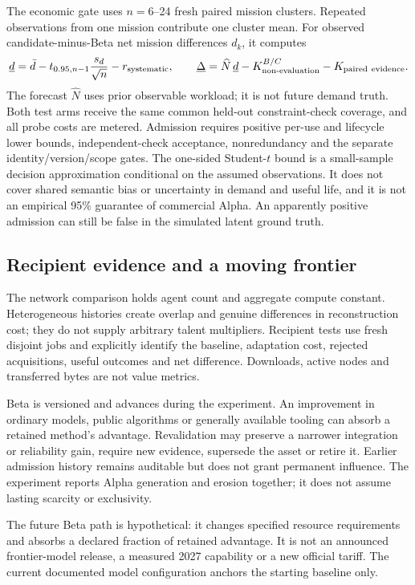 \documentclass[11pt,a4paper]{article}
\begin{document}
The economic gate uses $n=6$--24 fresh paired mission clusters. Repeated observations from one mission contribute one cluster mean. For observed candidate-minus-Beta net mission differences $d_k$, it computes
\begin{equation}
 \underline d=\bar d-t_{0.95,n-1}\frac{s_d}{\sqrt n}-r_{\rm systematic},\qquad
 \underline\Delta=\widehat N\,\underline d-K^{B/C}_{\rm non\text{-}evaluation}-K_{\rm paired\ evidence}.
\end{equation}
The forecast $\widehat N$ uses prior observable workload; it is not future demand truth. Both test arms receive the same common held-out constraint-check coverage, and all probe costs are metered. Admission requires positive per-use and lifecycle lower bounds, independent-check acceptance, nonredundancy and the separate identity/version/scope gates. The one-sided Student-$t$ bound is a small-sample decision approximation conditional on the assumed observations. It does not cover shared semantic bias or uncertainty in demand and useful life, and it is not an empirical 95\% guarantee of commercial Alpha. An apparently positive admission can still be false in the simulated latent ground truth.

\ResultAdmission

\subsection{Recipient evidence and a moving frontier}

The network comparison holds agent count and aggregate compute constant. Heterogeneous histories create overlap and genuine differences in reconstruction cost; they do not supply arbitrary talent multipliers. Recipient tests use fresh disjoint jobs and explicitly identify the baseline, adaptation cost, rejected acquisitions, useful outcomes and net difference. Downloads, active nodes and transferred bytes are not value metrics.

Beta is versioned and advances during the experiment. An improvement in ordinary models, public algorithms or generally available tooling can absorb a retained method's advantage. Revalidation may preserve a narrower integration or reliability gain, require new evidence, supersede the asset or retire it. Earlier admission history remains auditable but does not grant permanent influence. The experiment reports Alpha generation and erosion together; it does not assume lasting scarcity or exclusivity.

The future Beta path is hypothetical: it changes specified resource requirements and absorbs a declared fraction of retained advantage. It is not an announced frontier-model release, a measured 2027 capability or a new official tariff. The current documented model configuration anchors the starting baseline only.
\end{document}
